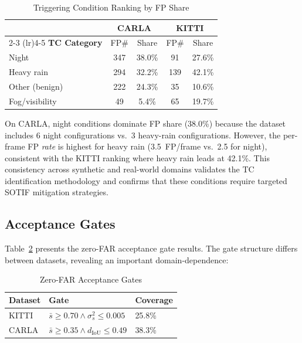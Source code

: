 \documentclass[conference]{IEEEtran}
\begin{document}
\begin{table}[t]
\caption{Triggering Condition Ranking by FP Share}
\label{tab:tc_ranking}
\centering
\small
\begin{tabular}{lcccc}
\toprule
& \multicolumn{2}{c}{\textbf{CARLA}} & \multicolumn{2}{c}{\textbf{KITTI}} \\
\cmidrule(lr){2-3} \cmidrule(lr){4-5}
\textbf{TC Category} & FP\# & Share & FP\# & Share \\
\midrule
Night & 347 & 38.0\% & 91 & 27.6\% \\
Heavy rain & 294 & 32.2\% & 139 & 42.1\% \\
Other (benign) & 222 & 24.3\% & 35 & 10.6\% \\
Fog/visibility & 49 & 5.4\% & 65 & 19.7\% \\
\bottomrule
\end{tabular}
\end{table}

On CARLA, night conditions dominate FP share (38.0\%) because the dataset includes 6 night configurations vs.\ 3 heavy-rain configurations. However, the per-frame FP \emph{rate} is highest for heavy rain (3.5~FP/frame vs.\ 2.5 for night), consistent with the KITTI ranking where heavy rain leads at 42.1\%. This consistency across synthetic and real-world domains validates the TC identification methodology and confirms that these conditions require targeted SOTIF mitigation strategies.

\subsection{Acceptance Gates}
\label{sec:gates}

Table~\ref{tab:gates} presents the zero-FAR acceptance gate results. The gate structure differs between datasets, revealing an important domain-dependence:

\begin{table}[t]
\caption{Zero-FAR Acceptance Gates}
\label{tab:gates}
\centering
\small
\begin{tabular}{lll}
\toprule
\textbf{Dataset} & \textbf{Gate} & \textbf{Coverage} \\
\midrule
KITTI & $\bar{s} \geq 0.70 \wedge \sigma^2_s \leq 0.005$ & 25.8\% \\
CARLA & $\bar{s} \geq 0.35 \wedge d_\text{IoU} \leq 0.49$ & 38.3\% \\
\bottomrule
\end{tabular}
\end{table}
\end{document}
